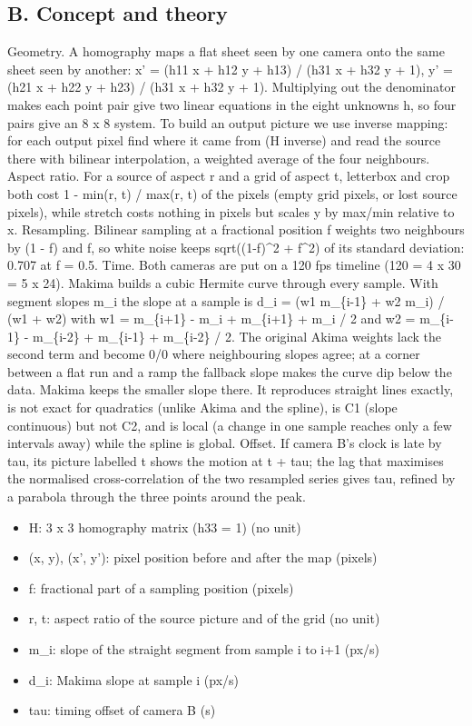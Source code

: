 \documentclass[11pt,a4paper]{article}
\begin{document}
\subsection*{B. Concept and theory}
Geometry. A homography maps a flat sheet seen by one camera onto the same sheet seen by another: x' = (h11 x + h12 y + h13) / (h31 x + h32 y + 1), y' = (h21 x + h22 y + h23) / (h31 x + h32 y + 1). Multiplying out the denominator makes each point pair give two linear equations in the eight unknowns h, so four pairs give an 8 x 8 system. To build an output picture we use inverse mapping: for each output pixel find where it came from (H inverse) and read the source there with bilinear interpolation, a weighted average of the four neighbours. Aspect ratio. For a source of aspect r and a grid of aspect t, letterbox and crop both cost 1 - min(r, t) / max(r, t) of the pixels (empty grid pixels, or lost source pixels), while stretch costs nothing in pixels but scales y by max/min relative to x. Resampling. Bilinear sampling at a fractional position f weights two neighbours by (1 - f) and f, so white noise keeps sqrt((1-f)\textasciicircum{}2 + f\textasciicircum{}2) of its standard deviation: 0.707 at f = 0.5. Time. Both cameras are put on a 120 fps timeline (120 = 4 x 30 = 5 x 24). Makima builds a cubic Hermite curve through every sample. With segment slopes m\_i the slope at a sample is d\_i = (w1 m\_\{i-1\} + w2 m\_i) / (w1 + w2) with w1 = \textbar{}m\_\{i+1\} - m\_i\textbar{} + \textbar{}m\_\{i+1\} + m\_i\textbar{} / 2 and w2 = \textbar{}m\_\{i-1\} - m\_\{i-2\}\textbar{} + \textbar{}m\_\{i-1\} + m\_\{i-2\}\textbar{} / 2. The original Akima weights lack the second term and become 0/0 where neighbouring slopes agree; at a corner between a flat run and a ramp the fallback slope makes the curve dip below the data. Makima keeps the smaller slope there. It reproduces straight lines exactly, is not exact for quadratics (unlike Akima and the spline), is C1 (slope continuous) but not C2, and is local (a change in one sample reaches only a few intervals away) while the spline is global. Offset. If camera B's clock is late by tau, its picture labelled t shows the motion at t + tau; the lag that maximises the normalised cross-correlation of the two resampled series gives tau, refined by a parabola through the three points around the peak.

\begin{itemize}[nosep]
\item H: 3 x 3 homography matrix (h33 = 1) (no unit)
\item (x, y), (x', y'): pixel position before and after the map (pixels)
\item f: fractional part of a sampling position (pixels)
\item r, t: aspect ratio of the source picture and of the grid (no unit)
\item m\_i: slope of the straight segment from sample i to i+1 (px/s)
\item d\_i: Makima slope at sample i (px/s)
\item tau: timing offset of camera B (s)
\end{itemize}
\end{document}
